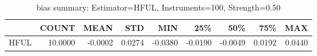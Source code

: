 \begin{table}[ht]
\centering
\caption{bias summary: Estimator=HFUL, Instruments=100, Strength=0.50}
\begin{tabular}{lrrrrrrrr}
\toprule
 & COUNT & MEAN & STD & MIN & 25\% & 50\% & 75\% & MAX \\
\midrule
HFUL & 10.0000 & -0.0002 & 0.0274 & -0.0380 & -0.0190 & -0.0049 & 0.0192 & 0.0440 \\
\bottomrule
\end{tabular}
\end{table}
